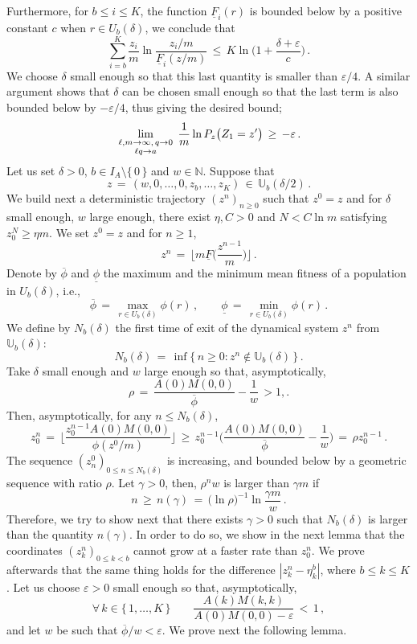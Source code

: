 \documentclass[a4paper,12pt]{article}
\theoremstyle{definition}
\theoremstyle{remark}
\def \g {\gamma}
\def \d {\delta}
\def \e {\varepsilon}
\def \N {\mathbb{N}}
\def \dU {\mathbb{U}}
\def\lmqq {{\genfrac{}{}{0pt}{1}{\ell,m\to\infty,\,q\to0}{\ell q\to a}}}
\begin{document}
Furthermore, for $b\leq i\leq K$,
the function $\underline{F}_i(r)$ is bounded
below by a positive constant $c$ when $r\in U_b(\d)$,
we conclude that
$$\sum_{i=b}^K
\frac{z_i}{m}\ln\frac{z_i/m}{\underline{F}_i(z/m)}\,\leq\,
K\ln\Big(
1+\frac{\d+\e}{c}
\Big)\,.$$
We choose $\d$ small enough so that this last quantity is
smaller than $\e/4$.
A similar argument shows that 
$\d$ can be chosen small enough
so that the last term is also bounded below by $-\e/4$, 
thus giving the desired bound;
$$\lim_\lmqq\,\frac{1}{m}\ln
P_{z}\big(
Z_1=z'
\big)\,\geq\,-\e\,.$$
Let us set $\d>0$, $b\in I_A\setminus\lbrace\,0\,\rbrace$ and $w\in\N$.
Suppose that 
$$z\,=\,(w,0,\dots,0,z_b,\dots,z_K)\,\in\,\dU_{b}(\d/2)\,.$$
We build next a deterministic trajectory $(z^n)_{n\geq0}$
such that $z^0=z$ and for $\d$ small enough, $w$ large enough,
there exist $\eta,C>0$ and $N< C\ln m$ satisfying
$z^N_0\geq \eta m$.
We set $z^0=z$ and for $n\geq1$,
$$
z^n\,=\,\bigg\lfloor
m\underline{F}\Big(
\frac{z^{n-1}}{m}
\Big)
\bigg\rfloor\,.
$$
Denote by $\overline{\phi}$ and $\underline{\phi}$
the maximum and the minimum mean fitness of a population
in $U_b(\d)$, i.e.,
$$\overline{\phi}\,=\,\max_{r\in U_b(\d)}\phi(r)\,,\qquad
\underline{\phi}\,=\,\min_{r\in U_b(\d)}\phi(r)\,.$$
We define by $N_b(\d)$ the first time of exit of the dynamical 
system $z^n$ from $\dU_b(\d)$:
$$N_b(\d)\,=\,\inf\big\lbrace\,
n\geq0:z^n\not\in \dU_b(\d) 
\,\big\rbrace\,.$$
Take $\d$ small enough and $w$ large enough so that, asymptotically,
$$\rho\,=\,\frac{A(0)M(0,0)}{\overline{\phi}}-\frac{1}{w}\,>1,.$$
Then, asymptotically, for any $n\leq N_b(\d)$,
$$z^n_0\,=\,\bigg\lfloor
\frac{z^{n-1}_0A(0)M(0,0)}{\phi(z^0/m)}
\bigg\rfloor\,\geq\,z^{n-1}_0\bigg(
\frac{A(0)M(0,0)}{\overline{\phi}}-\frac{1}{w}
\bigg)\,=\,\rho z^{n-1}_0\,.$$
The sequence
$(z^0_n)_{0\leq n\leq N_b(\d)}$ is increasing,
and bounded below by a geometric sequence with ratio $\rho$.
Let $\g>0$, then,
$\rho^n w$ is larger than $\g m$ if
$$n\,\geq\,n(\g)\,=\,\big(
\ln\rho
\big)^{-1}\ln\frac{\g m}{w}\,.$$
Therefore,
we try to show next that there exists $\g>0$ such that 
$N_b(\d)$ is larger than the quantity $n(\g)$.
In order to do so, we show in the next lemma that the coordinates $(z^n_k)_{0\leq k<b}$
cannot grow at a faster rate than $z^n_0$.
We prove afterwards that the same thing holds for the difference $|z_k^n-\eta^b_k|$,
where $b\leq k\leq K$.
Let us choose $\e>0$ small enough so that, asymptotically,
$$\forall\,k\in\lbrace\,1,\dots,K\,\rbrace\qquad
\frac{A(k)M(k,k)}{A(0)M(0,0)-\e}\,<\,1\,,$$
and let $w$ be such that $\overline{\phi}/w<\e$.
We prove next the following lemma. 
\end{document}
